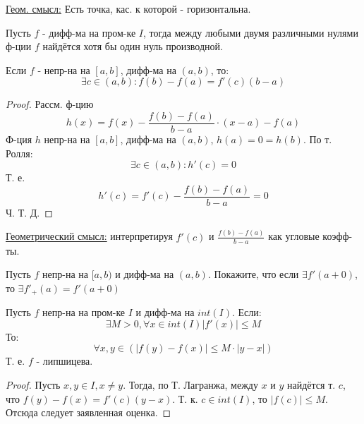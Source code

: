 \underline{Геом. смысл:} Есть точка, кас. к которой - горизонтальна.
\begin{consequence}
Пусть $f$ - дифф-ма на пром-ке $I$, тогда между любыми двумя различными нулями ф-ции $f$ найдётся хотя бы один нуль производной.
\end{consequence}
\begin{theorem}[Лагранжа]
Если $f$ - непр-на на $[a, b]$, дифф-ма на $(a, b)$, то:
\[
 \exists c \in (a, b) \colon f(b) - f(a) = f'(c)(b - a)
\]
\end{theorem}
\begin{proof}
Рассм. ф-цию
\[
  h(x) = f(x) - \frac{f(b) - f(a)}{b - a} \cdot (x - a) - f(a)
\]
Ф-ция $h$ непр-на на $[a, b]$, дифф-ма на $(a, b)$, $h(a) = 0 = h(b)$. По т. Ролля:
\[
\exists c \in (a, b) \colon h'(c) = 0
\]
Т. е. \[
h'(c) = f'(c) - \frac{f(b) - f(a)}{b - a} = 0
\]
Ч. Т. Д.
\end{proof}
\underline{Геометрический смысл:} интерпретируя $f'(c)$ и $\frac{f(b) - f(a)}{b - a}$  как угловые коэфф-ты.
\begin{task}
Пусть $f$ непр-на на $[a, b)$ и дифф-ма на $(a, b)$. Покажите, что если $\exists f'(a + 0)$, то $\exists f'_+(a) = f'(a + 0)$
\end{task}
\begin{consequence}
Пусть $f$ непр-на на пром-ке $I$ и дифф-ма на $int(I)$. Если:
\[
\exists M > 0, \forall x \in int(I) \left|f'(x)\right| \leq M
\]
То:
\[
\forall x, y \in (\left|f(y) - f(x)\right| \leq M \cdot \left|y - x\right|)
\]
Т. е. $f$ - липшицева.
\end{consequence}
\begin{proof}
 Пусть $x, y \in I, x \neq y$. Тогда, по Т. Лагранжа, между $x$ и $y$ найдётся т. $c$, что $f(y) - f(x) = f'(c) (y - x)$. Т. к. $c \in int(I)$, то $\left|f(c)\right| \leq M$. Отсюда следует заявленная оценка.
\end{proof}
